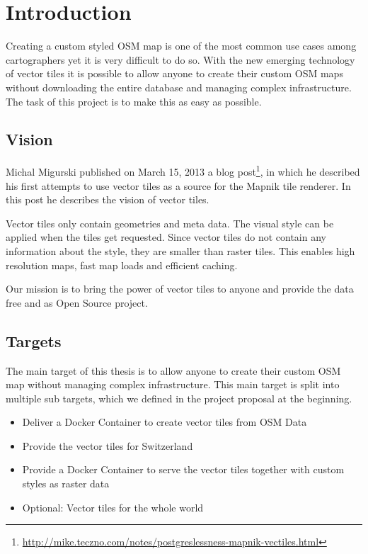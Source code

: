 \chapter{Introduction}


Creating a custom styled OSM map is one of the most common use cases
among cartographers yet it is very difficult to do so. With the new
emerging technology of vector tiles it is possible to allow anyone to
create their custom OSM maps without downloading the entire database and
managing complex infrastructure. The task of this project is to make
this as easy as possible.


\section{Vision}\label{vision}

Michal Migurski published on March 15, 2013 a blog
post\footnote{\url{http://mike.teczno.com/notes/postgreslessness-mapnik-vectiles.html}},
in which he described his first attempts to use vector tiles as a source
for the Mapnik tile renderer. In this post he describes the vision of
vector tiles.

Vector tiles only contain geometries and meta data. The visual style can
be applied when the tiles get requested. Since vector tiles do not
contain any information about the style, they are smaller than raster
tiles. This enables high resolution maps, fast map loads and efficient
caching.

Our mission is to bring the power of vector tiles to anyone and provide
the data free and as Open Source project.


\section{Targets}\label{targets}

The main target of this thesis is to allow anyone to create their custom
OSM map without managing complex infrastructure. This main target is
split into multiple sub targets, which we defined in the project proposal
at the beginning.

\begin{itemize}
\item
  Deliver a Docker Container to create vector tiles from OSM Data
\item
  Provide the vector tiles for Switzerland
\item
  Provide a Docker Container to serve the vector tiles together with
  custom styles as raster data
\item
  Optional: Vector tiles for the whole world
\end{itemize}

